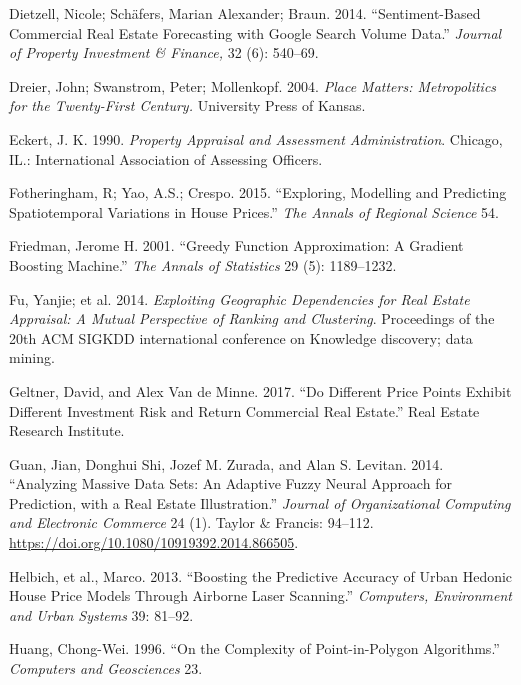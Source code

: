 \documentclass[12pt,]{article}
\begin{document}
\leavevmode\hypertarget{ref-Dietzell2014}{}%
Dietzell, Nicole; Schäfers, Marian Alexander; Braun. 2014.
``Sentiment-Based Commercial Real Estate Forecasting with Google Search
Volume Data.'' \emph{Journal of Property Investment \& Finance,} 32 (6):
540--69.

\leavevmode\hypertarget{ref-Dreier2004}{}%
Dreier, John; Swanstrom, Peter; Mollenkopf. 2004. \emph{Place Matters:
Metropolitics for the Twenty-First Century.} University Press of Kansas.

\leavevmode\hypertarget{ref-Eckert1990}{}%
Eckert, J. K. 1990. \emph{Property Appraisal and Assessment
Administration}. Chicago, IL.: International Association of Assessing
Officers.

\leavevmode\hypertarget{ref-Fotheringham2015}{}%
Fotheringham, R; Yao, A.S.; Crespo. 2015. ``Exploring, Modelling and
Predicting Spatiotemporal Variations in House Prices.'' \emph{The Annals
of Regional Science} 54.

\leavevmode\hypertarget{ref-Friedman2001}{}%
Friedman, Jerome H. 2001. ``Greedy Function Approximation: A Gradient
Boosting Machine.'' \emph{The Annals of Statistics} 29 (5): 1189--1232.

\leavevmode\hypertarget{ref-Fu2014}{}%
Fu, Yanjie; et al. 2014. \emph{Exploiting Geographic Dependencies for
Real Estate Appraisal: A Mutual Perspective of Ranking and Clustering}.
Proceedings of the 20th ACM SIGKDD international conference on Knowledge
discovery; data mining.

\leavevmode\hypertarget{ref-Geltner2017}{}%
Geltner, David, and Alex Van de Minne. 2017. ``Do Different Price Points
Exhibit Different Investment Risk and Return Commercial Real Estate.''
Real Estate Research Institute.

\leavevmode\hypertarget{ref-Guan2014}{}%
Guan, Jian, Donghui Shi, Jozef M. Zurada, and Alan S. Levitan. 2014.
``Analyzing Massive Data Sets: An Adaptive Fuzzy Neural Approach for
Prediction, with a Real Estate Illustration.'' \emph{Journal of
Organizational Computing and Electronic Commerce} 24 (1). Taylor \&
Francis: 94--112. \url{https://doi.org/10.1080/10919392.2014.866505}.

\leavevmode\hypertarget{ref-Helbich2013}{}%
Helbich, et al., Marco. 2013. ``Boosting the Predictive Accuracy of
Urban Hedonic House Price Models Through Airborne Laser Scanning.''
\emph{Computers, Environment and Urban Systems} 39: 81--92.

\leavevmode\hypertarget{ref-Huang1996}{}%
Huang, Chong-Wei. 1996. ``On the Complexity of Point-in-Polygon
Algorithms.'' \emph{Computers and Geosciences} 23.
\end{document}
